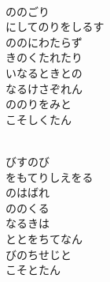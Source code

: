 \documentclass[10pt,b5j]{tarticle} %
\begin{document}
\vspace{1.5em} %
\newcommand{\linespace}{0.5em} %
\newcommand{\blocksize}{0.5\hsize} %
\newcommand{\itemmargin}{3em} %
\begin{enumerate} %
    \setlength{\itemindent}{\itemmargin} %
    \begin{minipage}[c]{\blocksize}
    
        \vspace{\linespace}
        \item~\\
        ののごり\\
        にしてのりをしるす\\
        ののにわたらず\\
        きのくたれたり\\
        いなるときとの\\
        なるけさぞれん\\
        ののりをみと\\
        こそしくたん
        
    \end{minipage}
    \begin{minipage}[c]{\blocksize}
        
        \vspace{\linespace}
        \item~\\
        びすのび\\
        をもてりしえをる\\
        のはばれ\\
        ののくる\\
        なるきは\\
        ととをちてなん\\
        びのちせじと\\
        こそとたん
        

\end{minipage}
\end{enumerate}
\end{document}
